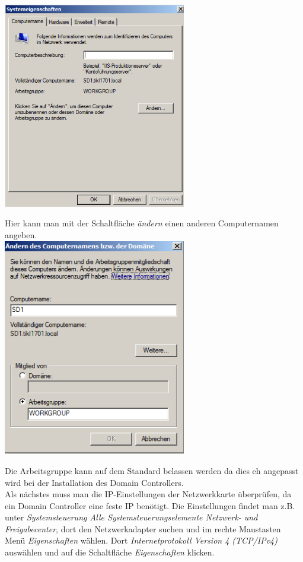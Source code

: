 \documentclass[12pt,a4paper,titlepage]{article} %
\begin{document}
	\includegraphics[width=8cm]{Bilder/002}
	
Hier kann man mit der Schaltfläche \emph{ändern} einen anderen Computernamen angeben.\\

	\includegraphics[width=8cm]{Bilder/003}
	
Die Arbeitsgruppe kann auf dem Standard belassen werden da dies eh angepasst wird bei der Installation des Domain Controllers.\\
Als nächstes muss man die IP-Einstellungen der Netzwerkkarte überprüfen, da ein Domain Controller eine feste IP benötigt. Die Einstellungen findet man z.B. unter \emph{Systemsteuerung  Alle Systemsteuerungselemente  Netzwerk- und Freigabecenter}, dort den Netzwerkadapter suchen und im rechte Maustasten Menü \emph{Eigenschaften} wählen. Dort \emph{Internetprotokoll Version 4 (TCP/IPv4)} auswählen und auf die Schaltfläche \emph{Eigenschaften} klicken.\\ %
\end{document}
